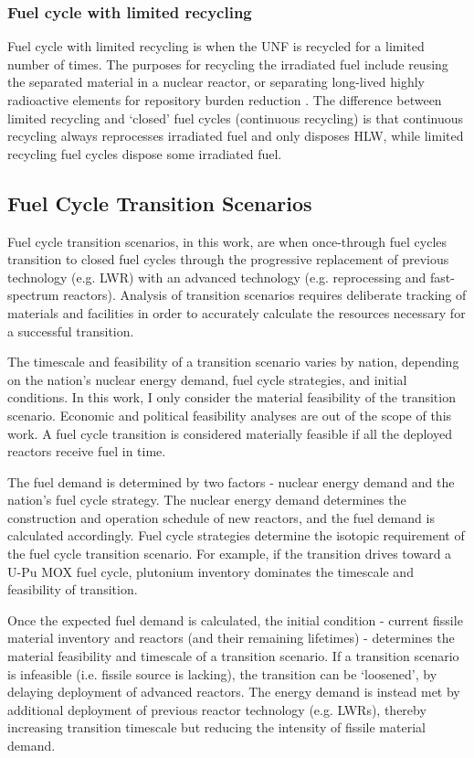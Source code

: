 \subsubsection{Fuel cycle with limited recycling}
Fuel cycle with limited recycling is when the \gls{UNF}
is recycled for a limited number of times. 
The purposes for recycling the irradiated fuel include
reusing the separated material in a nuclear reactor, or 
separating long-lived highly radioactive elements
for repository burden reduction \cite{wigeland_nuclear_2014}.
The difference
between limited recycling and `closed' fuel cycles (continuous
recycling) is that continuous recycling always reprocesses
irradiated fuel and only disposes \gls{HLW}, while limited
recycling fuel cycles dispose some irradiated fuel.


\subsection{Fuel Cycle Transition Scenarios}
Fuel cycle transition scenarios, in this work, are when
once-through fuel cycles transition to closed fuel
cycles through the progressive replacement of previous technology
(e.g. \gls{LWR}) with an advanced technology (e.g. reprocessing
and fast-spectrum reactors). Analysis of transition scenarios requires
deliberate tracking of materials and facilities in order
to accurately calculate the resources necessary for a
successful transition.

The timescale and feasibility of a transition scenario
varies by nation, depending on the nation's nuclear energy demand,
fuel cycle strategies, and initial conditions.
In this work, I only consider the material feasibility of the
transition scenario. Economic and political feasibility analyses
are out of the scope of this work. A fuel cycle transition is considered
materially feasible if all the deployed reactors receive fuel
in time.

The fuel demand is determined by two factors - nuclear energy demand
and the nation's fuel cycle strategy.
The nuclear energy demand determines the construction
and operation
schedule of new reactors, and the fuel demand is
calculated accordingly.
Fuel cycle strategies determine the isotopic
requirement of the fuel cycle transition scenario. For example,
if the transition drives toward a U-Pu \gls{MOX} fuel cycle,
plutonium inventory dominates the timescale and feasibility of transition.

Once the expected fuel demand is calculated,
the initial condition - current fissile material inventory
and reactors (and their remaining lifetimes) - determines
the material feasibility and timescale of a transition scenario.
If a transition scenario is infeasible (i.e. fissile source is lacking),
the transition can be `loosened', by delaying deployment
of advanced reactors. The energy demand is instead met by additional
deployment of previous reactor technology (e.g. \glspl{LWR}),
thereby increasing transition timescale but reducing the
intensity of fissile material demand.

